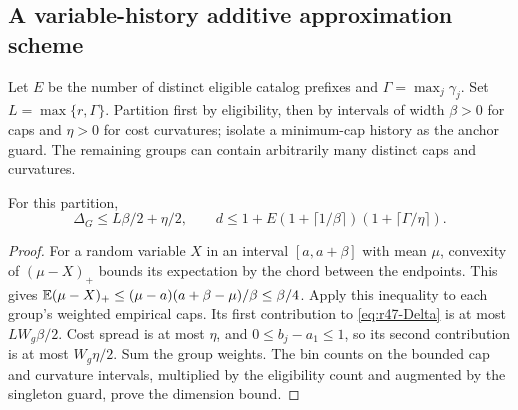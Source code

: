 \subsection{A variable-history additive approximation scheme}\label{sec:r47-scheme}
Let $E$ be the number of distinct eligible catalog prefixes and $\Gamma=\max_j\gamma_j$. Set $L=\max\{r,\Gamma\}$. Partition first by eligibility, then by intervals of width $\beta>0$ for caps and $\eta>0$ for cost curvatures; isolate a minimum-cap history as the anchor guard. The remaining groups can contain arbitrarily many distinct caps and curvatures.

\begin{lemma}\label{lem:r47-dispersion}
For this partition,
\begin{equation}\label{eq:r47-binned}
 \Delta_G\leq L\beta/2+\eta/2,\qquad
 d\leq1+E(1+\lceil1/\beta\rceil)(1+\lceil\Gamma/\eta\rceil).
\end{equation}
\end{lemma}
\begin{proof}
For a random variable $X$ in an interval $[a,a+\beta]$ with mean $\mu$, convexity of $(\mu-X)_+$ bounds its expectation by the chord between the endpoints. This gives
$\mathbb E(\mu-X)_+\leq(\mu-a)(a+\beta-\mu)/\beta\leq\beta/4$.
Apply this inequality to each group's weighted empirical caps. Its first contribution to \eqref{eq:r47-Delta} is at most $L W_g\beta/2$. Cost spread is at most $\eta$, and $0\leq b_j-a_1\leq1$, so its second contribution is at most $W_g\eta/2$. Sum the group weights. The bin counts on the bounded cap and curvature intervals, multiplied by the eligibility count and augmented by the singleton guard, prove the dimension bound.
\end{proof}

